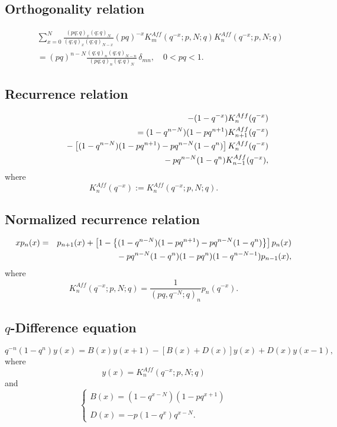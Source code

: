 \documentclass[envcountchap,graybox]{svmono}
\newcommand{\mathindent}{\hspace{7.5mm}}
\begin{document}
\subsection*{Orthogonality relation}
\begin{eqnarray}
\label{OrtAffqKrawtchouk}
& &\sum_{x=0}^N\frac{(pq;q)_x(q;q)_N}{(q;q)_x(q;q)_{N-x}}(pq)^{-x}K_m^{Aff}(q^{-x};p,N;q)K_n^{Aff}(q^{-x};p,N;q)\nonumber\\
& &{}=(pq)^{n-N}\frac{(q;q)_n(q;q)_{N-n}}{(pq;q)_n(q;q)_N}\,\delta_{mn},\quad 0<pq<1.
\end{eqnarray}

\subsection*{Recurrence relation}
\begin{eqnarray}
\label{RecAffqKrawtchouk}
& &-(1-q^{-x})K_n^{Aff}(q^{-x})\nonumber\\
& &{}=(1-q^{n-N})(1-pq^{n+1})K_{n+1}^{Aff}(q^{-x})\nonumber\\
& &{}\mathindent{}-\left[(1-q^{n-N})(1-pq^{n+1})-pq^{n-N}(1-q^n)\right]K_n^{Aff}(q^{-x})\nonumber\\
& &{}\mathindent\mathindent{}-pq^{n-N}(1-q^n)K_{n-1}^{Aff}(q^{-x}),
\end{eqnarray}
where
$$K_n^{Aff}(q^{-x}):=K_n^{Aff}(q^{-x};p,N;q).$$

\subsection*{Normalized recurrence relation}
\begin{eqnarray}
\label{NormRecAffqKrawtchouk}
xp_n(x)&=&p_{n+1}(x)+
\left[1-\left\{(1-q^{n-N})(1-pq^{n+1})-pq^{n-N}(1-q^n)\right\}\right]p_n(x)\nonumber\\
& &{}\mathindent{}-pq^{n-N}(1-q^n)(1-pq^n)(1-q^{n-N-1})p_{n-1}(x),
\end{eqnarray}
where
$$K_n^{Aff}(q^{-x};p,N;q)=\frac{1}{(pq,q^{-N};q)_n}p_n(q^{-x}).$$

\subsection*{$q$-Difference equation}
\begin{equation}
\label{dvAffqKrawtchouk}
q^{-n}(1-q^n)y(x)=B(x)y(x+1)-\left[B(x)+D(x)\right]y(x)+D(x)y(x-1),
\end{equation}
where
$$y(x)=K_n^{Aff}(q^{-x};p,N;q)$$
and
$$\left\{\begin{array}{l}\displaystyle B(x)=(1-q^{x-N})(1-pq^{x+1})\\
\\
\displaystyle D(x)=-p(1-q^x)q^{x-N}.\end{array}\right.$$
\end{document}
